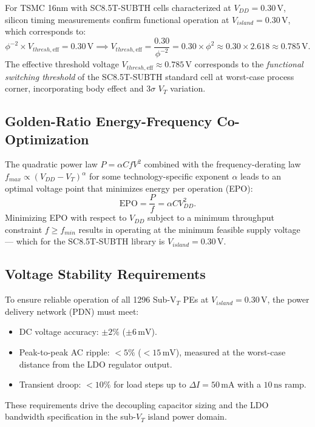 For TSMC 16nm with SC8.5T-SUBTH cells characterized at $V_{DD} = 0.30\,\text{V}$, silicon
timing measurements confirm functional operation at $V_{island} = 0.30\,\text{V}$, which
corresponds to:
\[
  \phi^{-2} \times V_{thresh,\text{eff}} = 0.30\,\text{V}
  \implies V_{thresh,\text{eff}} = \frac{0.30}{\phi^{-2}} = 0.30 \times \phi^2 \approx
  0.30 \times 2.618 \approx 0.785\,\text{V}.
\]
The effective threshold voltage $V_{thresh,\text{eff}} \approx 0.785\,\text{V}$ corresponds to
the \emph{functional switching threshold} of the SC8.5T-SUBTH standard cell at worst-case
process corner, incorporating body effect and $3\sigma$ $V_T$ variation.

\subsection{Golden-Ratio Energy-Frequency Co-Optimization}

The quadratic power law $P = \alpha C f V^2$ combined with the frequency-derating law
$f_{max} \propto (V_{DD} - V_T)^\alpha$ for some technology-specific exponent $\alpha$ leads
to an optimal voltage point that minimizes energy per operation (EPO):
\[
  \text{EPO} = \frac{P}{f} = \alpha C V_{DD}^2.
\]
Minimizing EPO with respect to $V_{DD}$ subject to a minimum throughput constraint $f \geq
f_{min}$ results in operating at the minimum feasible supply voltage — which for the
SC8.5T-SUBTH library is $V_{island} = 0.30\,\text{V}$.

\subsection{Voltage Stability Requirements}

To ensure reliable operation of all 1296 Sub-V$_T$ PEs at $V_{island} = 0.30\,\text{V}$,
the power delivery network (PDN) must meet:
\begin{itemize}
  \item DC voltage accuracy: $\pm 2\%$ ($\pm 6\,\text{mV}$).
  \item Peak-to-peak AC ripple: $< 5\%$ ($< 15\,\text{mV}$), measured at the worst-case
        distance from the LDO regulator output.
  \item Transient droop: $< 10\%$ for load steps up to $\Delta I = 50\,\text{mA}$ with a
        $10\,\text{ns}$ ramp.
\end{itemize}
These requirements drive the decoupling capacitor sizing and the LDO bandwidth specification
in the sub-$V_T$ island power domain.

